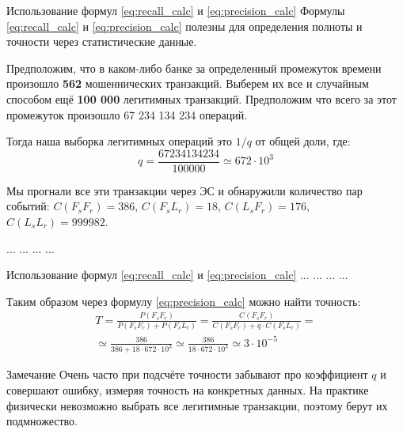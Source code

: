 \documentclass{beamer}
\newcommand{\auditorium}[1]{\color{red}{\textbf{#1}}}
\begin{document}
  \begin{frame}{Использование формул \eqref{eq:recall_calc} и \eqref{eq:precision_calc}}\label{frame:precision_calc_example}
  \small
  Формулы \eqref{eq:recall_calc} и \eqref{eq:precision_calc} полезны 
  для определения полноты и точности через статистические данные.
  
  Предположим, что в каком-либо банке за определенный промежуток времени
  произошло \textbf{562} мошеннических транзакций. 
  Выберем их все и случайным способом ещё \textbf{100 000} легитимных транзакций.
  Предположим что всего за этот промежуток произошло 67 234 134 234 операций. 
  
  Тогда наша выборка легитимных операций это $1/q$ от общей доли, где: 
  \begin{equation*}
  q = \frac{67234134234}{100000} \simeq 672 \cdot 10^3
  \end{equation*}
  
  Мы прогнали все эти транзакции через ЭС и обнаружили количество пар событий:
  $C(F_s F_r)= 386$, 
  $C(F_s L_r)= 18$, 
  $C(L_s F_r)= 176$, 
  $C(L_s L_r)= 999 982$.
   
  ... ... ... ...
  \end{frame}
   
  \begin{frame}{Использование формул \eqref{eq:recall_calc} и \eqref{eq:precision_calc}} 
  ... ... ... ...
  
  Таким образом через формулу  \eqref{eq:precision_calc} можно найти точность:
  \begin{eqnarray*}
  T = \frac{P(F_s F_r)}{P(F_s F_r) + P(F_s L_r )} = 
  \frac{C(F_s F_r)}{C(F_s F_r) + q \cdot C(F_s L_r)}  = \\
  \simeq \frac{386}{386 + 18 \cdot  672 \cdot 10^3 }
  \simeq \frac{386}{18 \cdot  672 \cdot 10^3 }
  \simeq 3 \cdot 10^{-5}
  \end{eqnarray*}
  
  \begin{block}{Замечание}
  	Очень часто при подсчёте точности забывают про коэффициент $q$ 
  	и совершают ошибку, измеряя точность на конкретных данных.
  	На практике физически невозможно выбрать все легитимные транзакции,
  	поэтому берут их подмножество.
  \end{block}

  \auditorium{ДЗ: найдите полноту}
  \end{frame}
  
\end{document}
